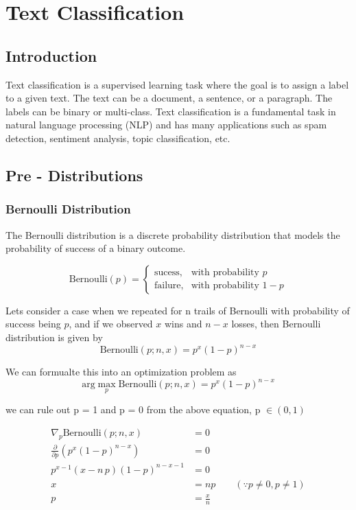 \chapter{Text Classification}
\section{Introduction}

Text classification is a supervised learning task where the goal is to assign a label to a given text. 
The text can be a document, a sentence, or a paragraph. The labels can be binary or multi-class. 
Text classification is a fundamental task in natural language processing (NLP) and has many applications such as spam detection, sentiment analysis, topic classification, etc.


\section{Pre - Distributions}
\subsection{Bernoulli Distribution}

The Bernoulli distribution is a discrete probability distribution that models the probability of success of a binary outcome.

\[   
\text{Bernoulli}(p) = 
     \begin{cases}
       \text{sucess,} & \text{with probability } p \\
	   \text{failure,} & \text{with probability } 1 - p
     \end{cases}
\]

Lets consider a case when we repeated for n trails of Bernoulli with probability of success being $p$, and if we observed $x$ wins and $n-x$ losses, 
then Bernoulli distribution is given by
$$
\text{Bernoulli}(p ; n, x) = p^x (1 - p)^{n - x} 
$$

\sol 
We can formualte this into an optimization problem as 
\[
	\text{arg} \max_p \text{Bernoulli}(p ; n, x) = p^x (1 - p)^{n - x} 
\]

we can rule out p = 1 and p = 0 from the above equation, p \(\in (0,1) \)

\begin{align*}
	\nabla_p \text{Bernoulli}(p ; n, x) & = 0 \\
	{\frac{\partial}{\partial p}}(p^{x}\left(1-p\right)^{n-x}) & = 0 \\
	p^{x-1}\left(x-n\,p\right)\left(1-p\right)^{n-x-1} &= 0\\
	x & = np \quad \quad (\because p \neq 0, p \neq 1) \\
	p & = \frac{x}{n}
\end{align*}

